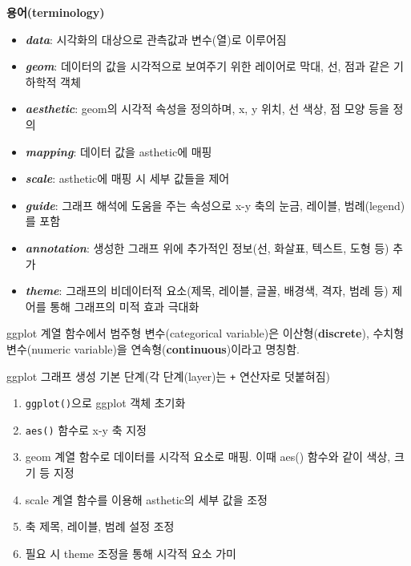 \documentclass[
  11pt,
]{krantz}
\makeatletter
\providecommand{\tightlist}{%
  \setlength{\itemsep}{0pt}\setlength{\parskip}{0pt}}
\newenvironment{kframe}{%
\medskip{}
\setlength{\fboxsep}{.8em}
 \def\at@end@of@kframe{}%
 \ifinner\ifhmode%
  \def\at@end@of@kframe{\end{minipage}}%
  \begin{minipage}{\columnwidth}%
 \fi\fi%
 \def\FrameCommand##1{\hskip\@totalleftmargin \hskip-\fboxsep
 \colorbox{shadecolor}{##1}\hskip-\fboxsep
     \hskip-\linewidth \hskip-\@totalleftmargin \hskip\columnwidth}%
 \MakeFramed {\advance\hsize-\width
   \@totalleftmargin\z@ \linewidth\hsize
   \@setminipage}}%
 {\par\unskip\endMakeFramed%
 \at@end@of@kframe}
\newenvironment{rmdblock}[1]
  {
  \begin{itemize}
  \renewcommand{\labelitemi}{
    \raisebox{-.7\height}[0pt][0pt]{
      {\setkeys{Gin}{width=3em,keepaspectratio}\texttt{[image: images/\#1]}}
    }
  }
  \setlength{\fboxsep}{1em}
  \begin{kframe}
  \item
  }
  {
  \end{kframe}
  \end{itemize}
  }
\newenvironment{rmdnote}
  {\begin{rmdblock}{note}}
  {\end{rmdblock}}
\makeatother
\begin{document}
\normalsize

\textbf{용어(terminology)}

\begin{itemize}
\tightlist
\item
  \emph{\textbf{data}}: 시각화의 대상으로 관측값과 변수(열)로 이루어짐
\item
  \emph{\textbf{geom}}: 데이터의 값을 시각적으로 보여주기 위한 레이어로 막대, 선, 점과 같은 기하학적 객체
\item
  \emph{\textbf{aesthetic}}: geom의 시각적 속성을 정의하며, x, y 위치, 선 색상, 점 모양 등을 정의
\item
  \emph{\textbf{mapping}}: 데이터 값을 asthetic에 매핑
\item
  \emph{\textbf{scale}}: asthetic에 매핑 시 세부 값들을 제어
\item
  \emph{\textbf{guide}}: 그래프 해석에 도움을 주는 속성으로 x-y 축의 눈금, 레이블, 범례(legend)를 포함
\item
  \emph{\textbf{annotation}}: 생성한 그래프 위에 추가적인 정보(선, 화살표, 텍스트, 도형 등) 추가
\item
  \emph{\textbf{theme}}: 그래프의 비데이터적 요소(제목, 레이블, 글꼴, 배경색, 격자, 범례 등) 제어를 통해 그래프의 미적 효과 극대화
\end{itemize}

\footnotesize

\begin{rmdnote}
\begin{rmdnote}

ggplot 계열 함수에서 범주형 변수(categorical variable)은 이산형(\textbf{discrete}), 수치형 변수(numeric variable)을 연속형(\textbf{continuous})이라고 명칭함.

\end{rmdnote}
\end{rmdnote}

\normalsize

ggplot 그래프 생성 기본 단계(각 단계(layer)는 \texttt{+} 연산자로 덧붙혀짐)

\begin{enumerate}
\def\labelenumi{\arabic{enumi}.}
\tightlist
\item
  \texttt{ggplot()}으로 ggplot 객체 초기화
\item
  \texttt{aes()} 함수로 x-y 축 지정
\item
  geom 계열 함수로 데이터를 시각적 요소로 매핑. 이때 aes() 함수와 같이 색상, 크기 등 지정
\item
  scale 계열 함수를 이용해 asthetic의 세부 값을 조정
\item
  축 제목, 레이블, 범례 설정 조정
\item
  필요 시 theme 조정을 통해 시각적 요소 가미
\end{enumerate}
\end{document}

